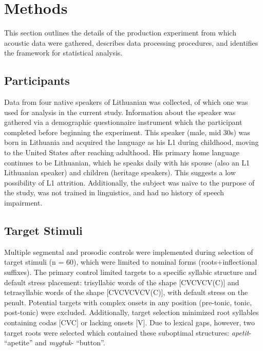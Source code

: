 \documentclass[english,man]{apa6}
\theoremstyle{definition}
\theoremstyle{definition}
\theoremstyle{definition}
\theoremstyle{remark}
\begin{document}
\section{Methods}\label{methods}

This section outlines the details of the production experiment from
which acoustic data were gathered, describes data processing procedures,
and identifies the framework for statistical analysis.

\subsection{Participants}\label{participants}

Data from four native speakers of Lithuanian was collected, of which one
was used for analysis in the current study. Information about the
speaker was gathered via a demographic questionnaire instrument which
the participant completed before beginning the experiment. This speaker
(male, mid 30s) was born in Lithuania and acquired the language as his
L1 during childhood, moving to the United States after reaching
adulthood. His primary home language continues to be Lithuanian, which
he speaks daily with his spouse (also an L1 Lithuanian speaker) and
children (heritage speakers). This suggests a low possibility of L1
attrition. Additionally, the subject was naïve to the purpose of the
study, was not trained in linguistics, and had no history of speech
impairment.

\subsection{Target Stimuli}\label{target-stimuli}

Multiple segmental and prosodic controls were implemented during
selection of target stimuli (n = 60), which were limited to nominal
forms (roots+inflectional suffixes). The primary control limited targets
to a specific syllabic structure and default stress placement:
trisyllabic words of the shape {[}CVCVCV(C){]} and tetrasyllabic words
of the shape {[}CVCVCVCV(C){]}, with default stress on the penult.
Potential targets with complex onsets in any position (pre-tonic, tonic,
post-tonic) were excluded. Additionally, target selection minimized root
syllables containing codas {[}CVC{]} or lacking onsets {[}V{]}. Due to
lexical gaps, however, two target roots were selected which contained
these suboptimal structures: \textit{apetit}- \enquote{apetite} and
\textit{mygtuk}- \enquote{button}.
\end{document}
